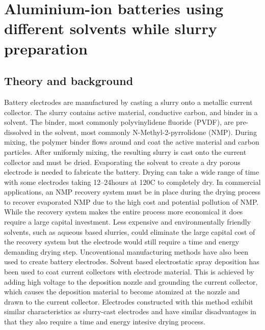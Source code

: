 
\chapter{Aluminium-ion batteries using different solvents while slurry preparation} %

\label{Chapter7} %


\newcommand{\keyword}[1]{\textbf{#1}}
\newcommand{\tabhead}[1]{\textbf{#1}}
\newcommand{\code}[1]{\texttt{#1}}
\newcommand{\file}[1]{\texttt{\bfseries#1}}
\newcommand{\option}[1]{\texttt{\itshape#1}}

\section{Theory and background}
Battery electrodes are manufactured by casting a slurry onto a metallic current collector. The slurry contains active material, conductive carbon, and binder in a solvent. The binder, most commonly polyvinylidene fluoride (PVDF), are pre-dissolved in the solvent, most commonly N-Methyl-2-pyrrolidone (NMP). During mixing, the polymer binder flows around and coat the active material and carbon particles\cite{ludwig_solvent-free_2016}. After uniformly mixing, the resulting slurry is cast onto the current collector and must be dried. Evaporating the solvent to create a dry porous electrode is needed to fabricate the battery. Drying can take a wide range of time with some electrodes taking 12–24hours at 120C to completely dry. In commercial applications, an NMP recovery system must be in place during the drying process to recover evaporated NMP due to the high cost and potential pollution of NMP. While the recovery system makes the entire process more economical it does require a large capital investment. Less expensive and environmentally friendly solvents, such as aqueous based slurries, could eliminate the large capital cost of the recovery system but the electrode would still require a time and energy demanding drying step. Uncoventional manufacturing methods have also been used to create battery electrodes. Solvent based electrostatic spray deposition has been used to coat current collectors with electrode material. This is achieved by adding high voltage to the deposition nozzle and grounding the current collector, which causes the deposition material to become atomized at the nozzle and drawn to the current collector. Electrodes constructed with this method exhibit similar characteristics as slurry-cast electrodes and have similar disadvantages in that they also require a time and energy intesive drying process.
